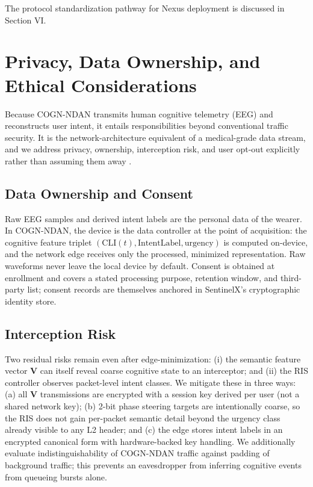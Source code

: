 \documentclass{BVP_CINC}
\newcommand{\COGN}{COGN-NDAN}
\begin{document}
The protocol standardization pathway for Nexus deployment is discussed in Section VI.

\section{Privacy, Data Ownership, and Ethical Considerations}

Because \COGN{} transmits human cognitive telemetry (EEG) and reconstructs user intent, it entails responsibilities beyond conventional traffic security. It is the network-architecture equivalent of a medical-grade data stream, and we address privacy, ownership, interception risk, and user opt-out explicitly rather than assuming them away \cite{xia2023bci}.

\subsection{Data Ownership and Consent}
Raw EEG samples and derived intent labels are the personal data of the wearer. In \COGN{}, the device is the data controller at the point of acquisition: the cognitive feature triplet $(\mathrm{CLI}(t), \mathrm{IntentLabel}, \mathrm{urgency})$ is computed on-device, and the network edge receives only the processed, minimized representation. Raw waveforms never leave the local device by default. Consent is obtained at enrollment and covers a stated processing purpose, retention window, and third-party list; consent records are themselves anchored in SentinelX's cryptographic identity store.

\subsection{Interception Risk}
Two residual risks remain even after edge-minimization: (i) the semantic feature vector $\mathbf{V}$ can itself reveal coarse cognitive state to an interceptor; and (ii) the RIS controller observes packet-level intent classes. We mitigate these in three ways: (a) all $\mathbf{V}$ transmissions are encrypted with a session key derived per user (not a shared network key); (b) 2-bit phase steering targets are intentionally coarse, so the RIS does not gain per-packet semantic detail beyond the urgency class already visible to any L2 header; and (c) the edge stores intent labels in an encrypted canonical form with hardware-backed key handling. We additionally evaluate indistinguishability of \COGN{} traffic against padding of background traffic; this prevents an eavesdropper from inferring cognitive events from queueing bursts alone.
\end{document}
